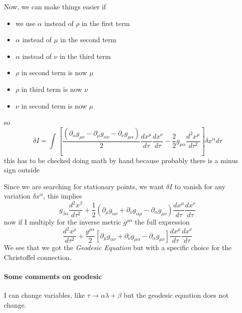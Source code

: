 Now, we can make things easier if
\begin{itemize}
\item we use $\alpha $ instead of $\rho $ in the first term
\item $\alpha $ instead of $\mu $ in the second term
\item $\alpha $ instead of $\nu $ in the third term
\item $\rho $ in second term is now $\mu $
\item $\rho $ in third term is now $\nu $
\item $\nu $ in second term is now $\mu $
\end{itemize}
so
\begin{equation}
	\delta I = \int_{}^{}{ \left[ \frac{\left( \partial_{\alpha } g_{\mu \nu } - \partial_{\mu } g_{\alpha \nu } - \partial_{\nu }g_{\mu \alpha } \right)}{2} \frac{d x^{\mu }}{d \tau } \frac{d x^{\nu }}{d \tau } - \frac{2}{2} g_{\mu \alpha } \frac{d ^{2}x^{\mu }}{d \tau ^{2}} \right] \delta x^{\alpha }d\tau }
\end{equation}
{\footnotesize this has to be checked doing math by hand because probably there is a minus sign outside}\par
Since we are searching for stationary points, we want $\delta I$ to vanish for any variation $\delta x^{\alpha } $, this implies 
\begin{equation}
g_{\beta \alpha } \frac{d ^{2}x^{\beta }}{d \tau ^{2}} + \frac{1}{2} \left( \partial_{\mu }g_{\alpha \nu } + \partial_{\nu } g_{\alpha \mu } - \partial_{\alpha }g_{\mu \nu } \right) \frac{d x^{\mu }}{d \tau } \frac{d x^{\nu }}{d \tau }
\end{equation}
now if I multiply for the inverse metric $g^{\rho \alpha }$ the full expression
\begin{equation}
	\frac{d ^{2}x^{\rho }}{d \tau ^{2}} + \frac{g^{\rho \alpha }}{2} \left[ \partial_{\mu }g_{\alpha \nu } + \partial_{\nu } g_{\mu \alpha } - \partial_{\alpha } g_{\mu \nu }\right] \frac{d x^{\mu }}{d \tau }\frac{d x^{\nu }}{d \tau }
\end{equation}
We see that we got the \emph{Geodesic Equation} but with a specific choice for the Christoffel connection.\par

\paragraph{Some comments on geodesic}
I can change variables, like $\tau \to \alpha \lambda + \beta $ but the geodesic equation does not change.\par

